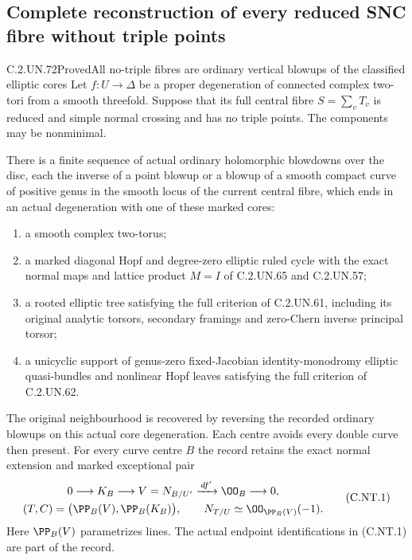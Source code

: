\subsection{Complete reconstruction of every reduced SNC fibre without triple points}

\begin{statement}{C.2.UN.72}{Proved}{All no-triple fibres are ordinary vertical blowups of the classified elliptic cores}
Let $f:U\to\Delta$ be a proper degeneration of connected complex
two-tori from a smooth threefold. Suppose that its full central
fibre $S=\sum_vT_v$ is reduced and simple normal crossing and
has no triple points. The components may be nonminimal.

There is a finite sequence of actual ordinary holomorphic
blowdowns over the disc, each the inverse of a point blowup
or a blowup of a smooth compact curve of positive genus in
the smooth locus of the current central fibre, which ends
in an actual degeneration with one of these marked cores:
\begin{enumerate}
\item a smooth complex two-torus;
\item a marked diagonal Hopf and degree-zero elliptic ruled
cycle with the exact normal maps and lattice product $M=I$
of C.2.UN.65 and C.2.UN.57;
\item a rooted elliptic tree satisfying the full criterion
of C.2.UN.61, including its original analytic torsors,
secondary framings and zero-Chern inverse principal torsor;
\item a unicyclic support of genus-zero fixed-Jacobian
identity-monodromy elliptic quasi-bundles and nonlinear
Hopf leaves satisfying the full criterion of C.2.UN.62.
\end{enumerate}
The original neighbourhood is recovered by reversing the
recorded ordinary blowups on this actual core degeneration.
Each centre avoids every double curve then present.
For every curve centre $B$ the record retains the exact
normal extension and marked exceptional pair
\[
 \begin{gathered}
 0\longrightarrow K_B\longrightarrow V=N_{B/U'}
                 \xrightarrow{\,df'\,}\OO_B\longrightarrow0,\\
 (T,C)=\bigl(\PP_B(V),\PP_B(K_B)\bigr),\qquad
 N_{T/U}\simeq\OO_{\PP_B(V)}(-1).
 \end{gathered}
\tag{C.NT.1}
\]
Here $\PP_B(V)$ parametrizes lines. The actual endpoint
identifications in (C.NT.1) are part of the record.


\end{statement}
